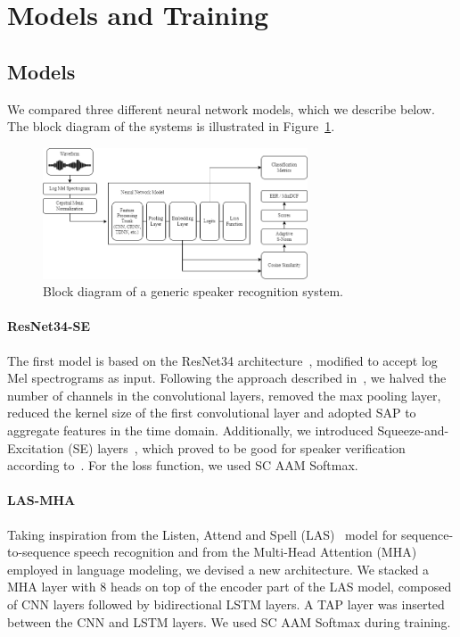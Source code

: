 \documentclass[conference]{IEEEtran}
\begin{document}
\section{Models and Training}
\label{sec:models}

\subsection{Models}

We compared three different neural network models, which we describe below. The block diagram of the systems is illustrated in Figure~\ref{fig:block_diagram}.

\begin{figure}[htbp]
    \centerline{\includegraphics[width=0.7\textwidth]{img/apr_block_diagram.png}}
    \caption{Block diagram of a generic speaker recognition system.}
    \label{fig:block_diagram}
\end{figure}

\paragraph{ResNet34-SE}

The first model is based on the ResNet34 architecture~\cite{he2016resnet}, modified to accept log Mel spectrograms as input. Following the approach described in~\cite{heo2020clova,chung2020defence}, we halved the number of channels in the convolutional layers, removed the max pooling layer, reduced the kernel size of the first convolutional layer and adopted SAP to aggregate features in the time domain. Additionally, we introduced Squeeze-and-Excitation (SE) layers~\cite{jie2020squeeze}, which proved to be good for speaker verification according to~\cite{zhang2021beijing}. For the loss function, we used SC AAM Softmax.

\paragraph{LAS-MHA}

Taking inspiration from the Listen, Attend and Spell (LAS)~\cite{irie2019las} model for sequence-to-sequence speech recognition and from the Multi-Head Attention (MHA)~\cite{vaswani2017attention} employed in language modeling, we devised a new architecture. We stacked a MHA layer with 8 heads on top of the encoder part of the LAS model, composed of CNN layers followed by bidirectional LSTM layers. A TAP layer was inserted between the CNN and LSTM layers. We used SC AAM Softmax during training.
\end{document}
